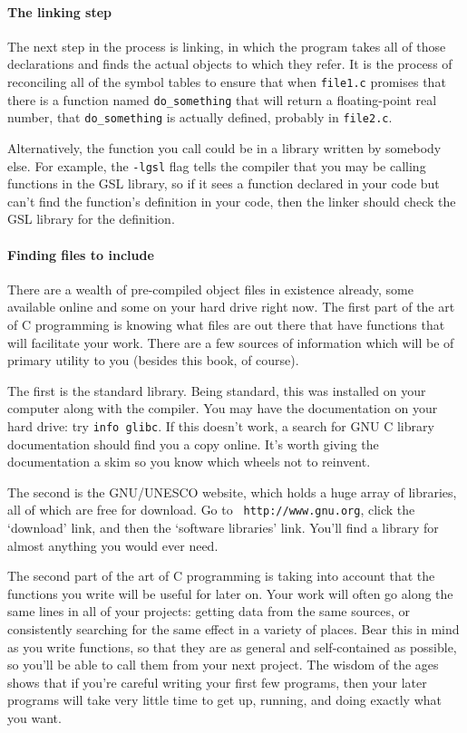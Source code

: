\documentclass[12pt]{article}
\def\ind#1{\index{#1}#1}
\begin{document}
\paragraph{The \ind{linking} step}
The next step in the process is linking, in which the program takes all
of those declarations and finds the actual objects to which they refer. It
is the process of reconciling all of the symbol tables to ensure that when
{\tt file1.c} promises that there is a function named {\tt do\_something}
that will return a floating-point real number, that {\tt do\_something}
is actually defined,  probably in {\tt file2.c}.

Alternatively, the function you call could be in a library written by
somebody else.  For example, the {\tt -lgsl} flag tells the compiler that
you may be calling functions in the GSL library, so if it sees a function
declared in your code but can't find the function's definition in your
code, then the linker should check the GSL library for the definition.


\paragraph{Finding files to include}
There are a wealth of pre-compiled object files in existence already,
some available online and some on your hard drive right now.  The first
part of the art of C programming is knowing what files are out there that have
functions that will facilitate your work. There
are a few sources of information which will be of primary utility to you
(besides this book, of course).

The first is the standard library. Being standard, this was
installed on your computer along with the compiler. You may have the
documentation on your hard drive: try {\tt info glibc}. If this doesn't
work, a search for GNU C library documentation should find you a copy
online. It's worth giving the documentation a skim so you know which wheels not to reinvent.

The second is the GNU/UNESCO website, which holds a huge array
of libraries, all of which are free for download. Go to {\tt
http://www.gnu.org}, click the `download' link, and then the `software
libraries' link. You'll find a library for almost anything you would
ever need.

The second part of the art of C programming is taking into account that
the functions you write will be useful for later on. Your work will often
go along the same lines in all of your projects: getting data from the
same sources, or consistently searching for the same effect in a
variety of places. Bear this in mind as you write functions, so that they
are as general and self-contained as possible, so you'll be able to call
them from your next project. The wisdom of the ages shows that if you're
careful writing your first few programs, then your later programs will
take very little time to get up, running, and doing exactly what you want.
\end{document}
